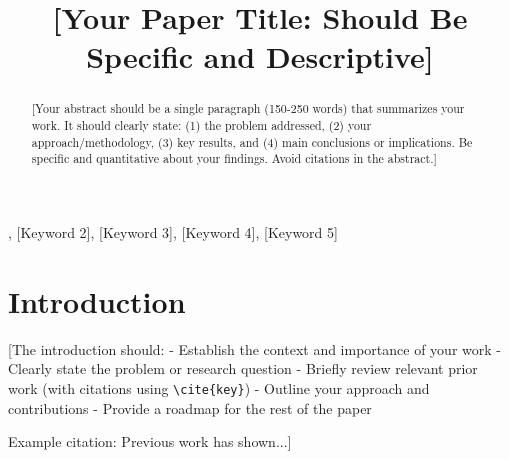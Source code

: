 \documentclass[conference]{IEEEtran}
\begin{document}
\title{[Your Paper Title: Should Be Specific and Descriptive]}

\author{
}

\maketitle

\begin{IEEEkeywords}
[Keyword 1], [Keyword 2], [Keyword 3], [Keyword 4], [Keyword 5]
\end{IEEEkeywords}

\begin{abstract}
[Your abstract should be a single paragraph (150-250 words) that summarizes your work. It should clearly state: 
(1) the problem addressed, 
(2) your approach/methodology, 
(3) key results, and 
(4) main conclusions or implications. 
Be specific and quantitative about your findings. Avoid citations in the abstract.]
\end{abstract}

\section{Introduction}
[The introduction should:
- Establish the context and importance of your work
- Clearly state the problem or research question
- Briefly review relevant prior work (with citations using \verb|\cite{key}|)
- Outline your approach and contributions
- Provide a roadmap for the rest of the paper

Example citation: Previous work \cite{author2023paper} has shown...]
\end{document}
